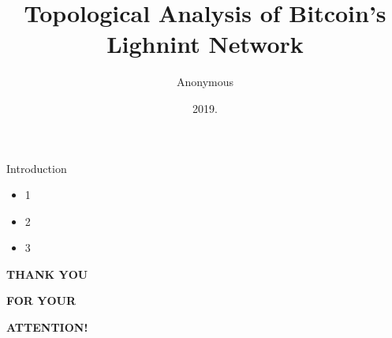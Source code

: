 \documentclass[bigger]{beamer}
\title{\bf Topological Analysis of Bitcoin's Lighnint Network}
\author{Anonymous}
\institute{Eötvös Loránd University (ELTE), \\ Budapest, Hungary}
\date{2019.}
\begin{document}
{
%
\frame{\vspace{15mm}\titlepage}
}

\begin{frame}{Introduction}
\begin{itemize}
\item 1
\item 2
\item 3
\end{itemize}
\end{frame}


{
%
\begin{frame}{}

\bigskip\bigskip\bigskip

{\bf\Huge\color{white} THANK YOU}

\bigskip

{\bf\Huge\color{white} FOR YOUR}

\bigskip

{\bf\Huge\color{white} ATTENTION!}

\end{frame}
}
\end{document}
